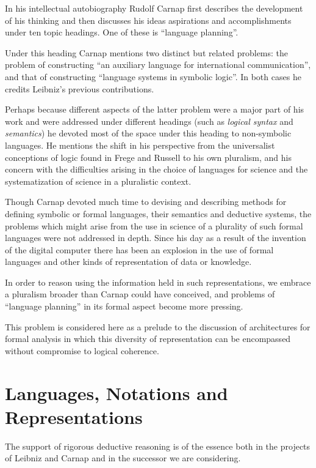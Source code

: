 In his intellectual autobiography \cite{carnap63} Rudolf Carnap
first describes the development of his thinking and then discusses
his ideas aspirations and accomplishments under ten topic headings.
One of these is ``language planning''.

Under this heading Carnap mentions two distinct but related problems:
the problem of constructing ``an auxiliary language for international
communication'', and that of constructing ``language systems in
symbolic logic''. 
In both cases he credits Leibniz's previous contributions.

Perhaps because different aspects of the latter problem were a major
part of his work and were addressed under different headings (such as
\emph{logical syntax} and \emph{semantics}) he devoted most of the
space under this heading to non-symbolic languages.
He mentions the shift in his perspective from the universalist
conceptions of logic found in Frege and Russell to his own pluralism,
and his concern with the difficulties arising in the choice of
languages for science and the systematization of science in a
pluralistic context. 

Though Carnap devoted much time to devising and describing methods for
defining symbolic or formal languages, their semantics and deductive systems,
the problems which might arise from the use in science of a plurality of
such formal languages were not addressed in depth. 
Since his day as a result of the invention of the digital computer
there has been an explosion in the use of formal languages and other
kinds of representation of data or knowledge.

In order to reason using the information held in such representations,
we embrace a pluralism broader than Carnap could have conceived,
and problems of ``language planning'' in its formal aspect become more pressing.

This problem is considered here as a prelude to the discussion of
architectures for formal analysis in which this diversity of
representation can be encompassed without compromise to logical
coherence.

\section{Languages, Notations and Representations}

The support of rigorous deductive reasoning is of the essence both in
the projects of Leibniz and Carnap and in the successor we are
considering.


